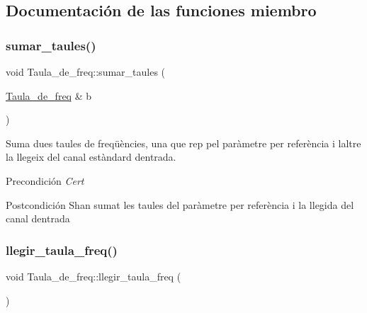 \subsection{Documentación de las funciones miembro}
\mbox{\label{class_taula__de__freq_a59add68c3c129a8908907b038d6344f8}} 
\subsubsection{\texorpdfstring{sumar\+\_\+taules()}{sumar\_taules()}}
{\footnotesize\ttfamily void Taula\+\_\+de\+\_\+freq\+::sumar\+\_\+taules (\begin{DoxyParamCaption}\item[{\hyperlink{class_taula__de__freq}{Taula\+\_\+de\+\_\+freq} \&}]{b }\end{DoxyParamCaption})}



Suma dues taules de freqüències, una que rep pel paràmetre per referència i l\textquotesingle{}altre la llegeix del canal estàndard d\textquotesingle{}entrada. 

\begin{DoxyPrecond}{Precondición}
{\itshape Cert} 
\end{DoxyPrecond}
\begin{DoxyPostcond}{Postcondición}
S\textquotesingle{}han sumat les taules del paràmetre per referència i la llegida del canal d\textquotesingle{}entrada 
\end{DoxyPostcond}
\mbox{\label{class_taula__de__freq_a6e3d7bfaa7227f9b7603864c7a3da2cf}} 
\subsubsection{\texorpdfstring{llegir\+\_\+taula\+\_\+freq()}{llegir\_taula\_freq()}}
{\footnotesize\ttfamily void Taula\+\_\+de\+\_\+freq\+::llegir\+\_\+taula\+\_\+freq (\begin{DoxyParamCaption}{ }\end{DoxyParamCaption})}



